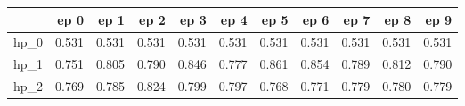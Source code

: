 \begin{tabular}{lrrrrrrrrrr}
\toprule
{} &   ep 0 &   ep 1 &   ep 2 &   ep 3 &   ep 4 &   ep 5 &   ep 6 &   ep 7 &   ep 8 &   ep 9 \\
\midrule
hp\_0 &  0.531 &  0.531 &  0.531 &  0.531 &  0.531 &  0.531 &  0.531 &  0.531 &  0.531 &  0.531 \\
hp\_1 &  0.751 &  0.805 &  0.790 &  0.846 &  0.777 &  0.861 &  0.854 &  0.789 &  0.812 &  0.790 \\
hp\_2 &  0.769 &  0.785 &  0.824 &  0.799 &  0.797 &  0.768 &  0.771 &  0.779 &  0.780 &  0.779 \\
\bottomrule
\end{tabular}
